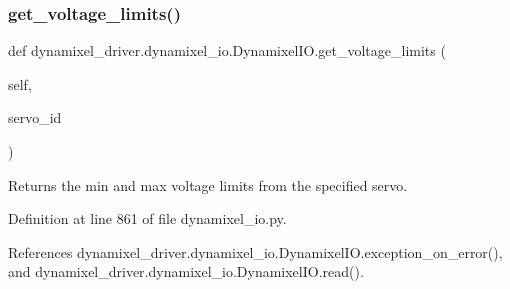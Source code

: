 \subsubsection{\texorpdfstring{get\+\_\+voltage\+\_\+limits()}{get\_voltage\_limits()}}
{\footnotesize\ttfamily def dynamixel\+\_\+driver.\+dynamixel\+\_\+io.\+Dynamixel\+I\+O.\+get\+\_\+voltage\+\_\+limits (\begin{DoxyParamCaption}\item[{}]{self,  }\item[{}]{servo\+\_\+id }\end{DoxyParamCaption})}

\begin{DoxyVerb}Returns the min and max voltage limits from the specified servo.
\end{DoxyVerb}
 

Definition at line 861 of file dynamixel\+\_\+io.\+py.



References dynamixel\+\_\+driver.\+dynamixel\+\_\+io.\+Dynamixel\+I\+O.\+exception\+\_\+on\+\_\+error(), and dynamixel\+\_\+driver.\+dynamixel\+\_\+io.\+Dynamixel\+I\+O.\+read().



